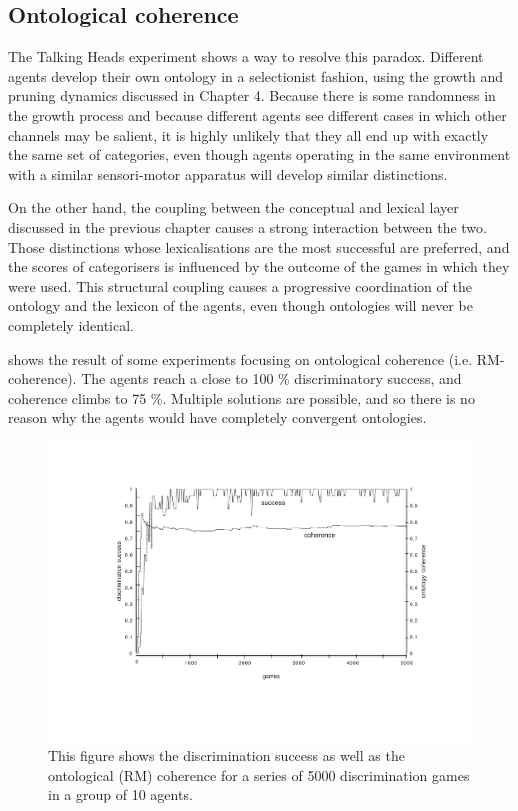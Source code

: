 \subsection{Ontological coherence}

The Talking Heads experiment shows a way to resolve
this paradox. Different agents develop their own 
ontology in a selectionist fashion,
using the growth and pruning dynamics discussed in Chapter 4. 
Because there is some randomness in the growth
process and because different agents see different cases
in which other channels may be salient, it is highly
unlikely that they all end up with exactly the same 
set of categories, even though 
agents operating in the same environment with a similar 
sensori-motor apparatus will develop similar distinctions. 

On the other hand, the coupling between the conceptual
and lexical layer discussed in the previous chapter
causes a strong interaction between the two. Those 
distinctions whose lexicalisations are the most successful 
are preferred, and the scores
of categorisers is influenced by the outcome of the 
games in which they were used. This structural coupling
causes a progressive coordination of the ontology and 
the lexicon of the agents, even though ontologies will 
never be completely identical. 

 shows the result of some experiments 
focusing on ontological coherence (i.e. RM-coherence). 
The agents reach a close to 100 \% discriminatory 
success, and coherence climbs to 75 \%. 
Multiple solutions are possible, and so there is no reason why the 
agents would have completely convergent ontologies.

\begin{figure}[htbp]
  \centerline{\includegraphics[width=.80\textwidth]{chap7/figs/coh}}
\caption{\label{coh} This figure shows the discrimination
success as well as the ontological (RM) coherence for
a series of 5000 discrimination games in a group of 10 agents.}
\end{figure}

